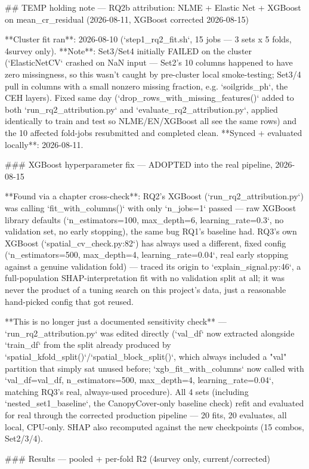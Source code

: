 ## TEMP holding note — RQ2b attribution: NLME + Elastic Net + XGBoost on mean_cr_residual (2026-08-11, XGBoost corrected 2026-08-15)

**Cluster fit ran**: 2026-08-10 (`step1_rq2_fit.sh`, 15 jobs — 3 sets x 5 folds, 4survey only).
**Note**: Set3/Set4 initially FAILED on the cluster (`ElasticNetCV` crashed on NaN input — Set2's
10 columns happened to have zero missingness, so this wasn't caught by pre-cluster local
smoke-testing; Set3/4 pull in columns with a small nonzero missing fraction, e.g. `soilgrids_ph`,
the CEH layers). Fixed same day (`drop_rows_with_missing_features()` added to both
`run_rq2_attribution.py` and `evaluate_rq2_attribution.py`, applied identically to train and test
so NLME/EN/XGBoost all see the same rows) and the 10 affected fold-jobs resubmitted and completed
clean. **Synced + evaluated locally**: 2026-08-11.

### XGBoost hyperparameter fix — ADOPTED into the real pipeline, 2026-08-15

**Found via a chapter cross-check**: RQ2's XGBoost (`run_rq2_attribution.py`) was calling
`fit_with_columns()` with only `n_jobs=1` passed — raw XGBoost library defaults
(`n_estimators=100, max_depth=6, learning_rate=0.3`, no validation set, no early stopping), the
same bug RQ1's baseline had. RQ3's own XGBoost (`spatial_cv_check.py:82`) has always used a
different, fixed config (`n_estimators=500, max_depth=4, learning_rate=0.04`, real early stopping
against a genuine validation fold) — traced its origin to `explain_signal.py:46`, a full-population
SHAP-interpretation fit with no validation split at all; it was never the product of a tuning
search on this project's data, just a reasonable hand-picked config that got reused.

**This is no longer just a documented sensitivity check** — `run_rq2_attribution.py` was edited
directly (`val_df` now extracted alongside `train_df` from the split already produced by
`spatial_kfold_split()`/`spatial_block_split()`, which always included a "val" partition that
simply sat unused before; `xgb_fit_with_columns` now called with
`val_df=val_df, n_estimators=500, max_depth=4, learning_rate=0.04`, matching RQ3's real,
always-used procedure). All 4 sets (including `nested_set1_baseline`, the CanopyCover-only
baseline check) refit and evaluated for real through the corrected production pipeline — 20 fits,
20 evaluates, all local, CPU-only. SHAP also recomputed against the new checkpoints (15 combos,
Set2/3/4).

### Results — pooled + per-fold R2 (4survey only, current/corrected)

